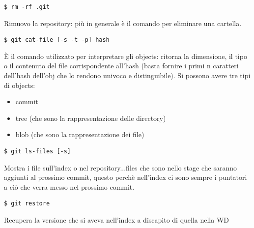 \begin{verbatim}
$ rm -rf .git
\end{verbatim}
Rimuovo la repository: più in generale è il comando per eliminare una cartella.

\begin{verbatim}
$ git cat-file [-s -t -p] hash
\end{verbatim}
È il comando utilizzato per interpretare gli objects: ritorna la dimensione, il tipo o il contenuto del file corrispondente all'hash (basta fornire i primi n caratteri dell'hash dell'obj che lo rendono univoco e distinguibile). Si possono avere tre tipi di objects:
\begin{itemize}
    \item commit
    \item tree (che sono la rappresentazione delle directory)
    \item blob (che sono la rappresentazione dei file)
\end{itemize}

\begin{verbatim}
$ git ls-files [-s]
\end{verbatim}
Mostra i file sull'index o nel repository...files che sono nello stage che saranno aggiunti al prossimo commit, questo perchè nell'index ci sono sempre i puntatori a ciò che verra messo nel prossimo commit.

\begin{verbatim}
$ git restore
\end{verbatim}
Recupera la versione che si aveva nell'index a discapito di quella nella WD

